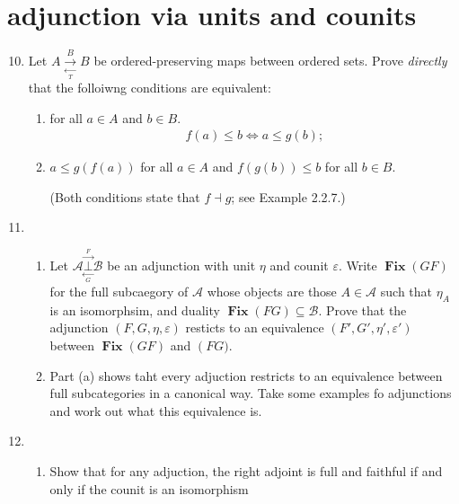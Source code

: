 \documentclass[12pt,a4paper]{report}
\newcommand{\ADJOINT}[2]{\underset{\underset{#2}\longleftarrow}{\overset{\overset{#1}\longrightarrow}\bot }}
\newcommand{\CAT}[1]{\mathscr{#1}}
\newcommand{\CATSET}[1]{\operatorname{\textbf{#1}}}
\begin{document}
\section{adjunction via units and counits}
\newcommand{\FUNCTOR}[2]{\underset{\underset{#2}\longleftarrow}{\overset{#1}\longrightarrow}}
\begin{enumerate}[label=\textbf{2.2.\arabic*}]
\setcounter{enumi}{9}
	\item Let $A\FUNCTOR{B}{T}B$ be ordered-preserving maps between ordered sets. Prove \textit{directly} that the folloiwng conditions are equivalent:
	\begin{enumerate}[label=(\alph*)]
		\item for all $a \in A$ and $b \in B$.
		\begin{align*}
			f(a) \le b \iff a \le g(b);
		\end{align*}
		
		\item $a \le g(f(a))$ for all $a \in A$ and $f(g(b))\le b$ for all $b \in B$.
		
		(Both conditions state that $f \dashv g$; see Example 2.2.7.)
	\end{enumerate}
	
	\item \begin{enumerate}[label=(\alph*)]
	
		\item Let $\CAT{A}\ADJOINT{F}{G}\CAT{B}$ be an adjunction with unit $\eta$ and counit $\varepsilon$.  Write $\CATSET{Fix}(GF)$ for the full subcaegory of $\CAT{A}$ whose objects are those $A \in \CAT{A}$ such that $\eta_A$ is an isomorphsim, and duality $\CATSET{Fix}(FG)\subseteq \CAT{B}$.  Prove that the adjunction $(F,G,\eta, \varepsilon)$ resticts to an equivalence $(F', G', \eta', \varepsilon')$ between $\CATSET{Fix}(GF)$ and $\CATSET(FG)$.
		
		\item Part (a) shows taht every adjuction restricts to an equivalence between full subcategories in a canonical way.  Take some examples fo adjunctions and work out what this equivalence is.
	
	\end{enumerate}
	
	\item \begin{enumerate}[label=(\alph*)]
	
		\item Show that for any adjuction, the right adjoint is full and faithful if and only if the counit is an isomorphism
		

\end{enumerate}
\end{enumerate}
\end{document}
